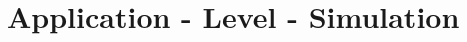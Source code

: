 \documentclass[]{nsm-thesis}
\begin{document}
\chapter{Application - Level - Simulation}


\begin{comment}
	\chapter{Evaluation}


\begin{itemize}
\item measurement setup / results / evaluation / discussion
\item whatever you have done, you must comment it, compare it to other systems, evaluate it
\item usually, adequate graphs help to show the benefits of your approach
\item each result/graph must not only be described, but also discussed (What's the reason for this peak? Why have you observed this effect? What does this tell about your architecture/system/implementation?)
\item recommended length: approximately one third of the thesis.
\end{itemize}
\end{comment}





\cleardoublepage

\listofabbreviations
\clearpage

\listoffigures
\clearpage

\listoftables
\clearpage

\printbibliography
\end{document}
